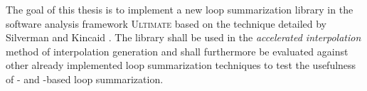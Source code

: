 
The goal of this thesis is to implement a new loop summarization library in the software analysis framework \textsc{Ultimate}\cite{Zitat02} based on the technique detailed by Silverman and Kincaid \cite{10.1007/978-3-030-25543-5_7}. The library shall be used in the \textsl{accelerated interpolation} method of interpolation generation and shall furthermore be evaluated against other already implemented loop summarization techniques to test the usefulness of \qvasr- and \qvasrs-based loop summarization.